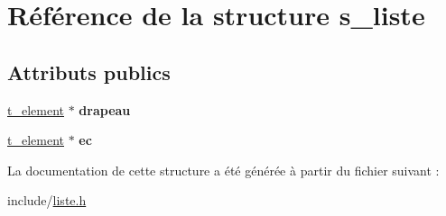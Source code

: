 \hypertarget{structs__liste}{}\section{Référence de la structure s\+\_\+liste}
\label{structs__liste}
\subsection*{Attributs publics}
\begin{DoxyCompactItemize}
\item 
\mbox{\label{structs__liste_a9b354e206c3753b25822e9e5b5a0b43f}} 
\hyperlink{structt__element}{t\+\_\+element} $\ast$ {\bfseries drapeau}
\item 
\mbox{\label{structs__liste_a46e022d00df8edfb20df409eb60845ad}} 
\hyperlink{structt__element}{t\+\_\+element} $\ast$ {\bfseries ec}
\end{DoxyCompactItemize}


La documentation de cette structure a été générée à partir du fichier suivant \+:\begin{DoxyCompactItemize}
\item 
include/\hyperlink{liste_8h}{liste.\+h}\end{DoxyCompactItemize}
